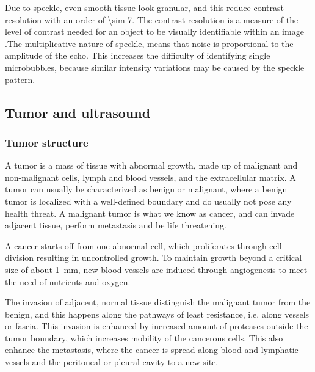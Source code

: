Due to speckle, even smooth tissue look granular, and this reduce contrast resolution with an order of \num{\sim 7}. The contrast resolution is a measure of the level of contrast needed for an object to be visually identifiable within an image .The multiplicative nature of speckle, means that noise is proportional to the amplitude of the echo. This increases the difficulty of identifying single microbubbles, because similar intensity variations may be caused by the speckle pattern. 
%

\subsection{Tumor and ultrasound}
\subsubsection{Tumor structure}

 A tumor is a mass of tissue with abnormal growth, made up of malignant and non-malignant cells, lymph and blood vessels, and the extracellular matrix. A tumor can usually be characterized as benign or malignant, where a benign tumor is localized with a well-defined boundary and do usually not pose any health threat. A malignant tumor is what we know as cancer, and can invade adjacent tissue, perform metastasis and be life threatening\cite{king2006cancer}. 

A cancer starts off from one abnormal cell, which proliferates through cell division resulting in uncontrolled growth. To maintain growth beyond a critical size of about \SI{1}{\milli\metre}\cite{king2006cancer}, new blood vessels are induced through angiogenesis to meet the need of nutrients and oxygen. 

The invasion of adjacent, normal tissue distinguish the malignant tumor from the benign, and this happens along  the pathways of least resistance, i.e. along vessels or fascia. This invasion is enhanced by increased amount of proteases outside the tumor boundary, which increases mobility of the cancerous cells. This also enhance the metastasis, where the cancer is spread along blood and lymphatic vessels and the peritoneal or pleural cavity to a new site\cite{king2006cancer}.
 
